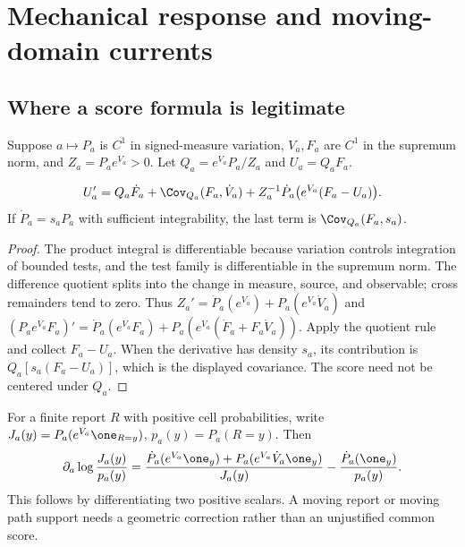 \section{Mechanical response and moving-domain currents}\label{sec:response}
\subsection{Where a score formula is legitimate}
Suppose $a\mapsto P_a$ is $C^1$ in signed-measure variation, $V_a,F_a$ are $C^1$ in the supremum norm, and $Z_a=P_ae^{V_a}>0$. Let $Q_a=e^{V_a}P_a/Z_a$ and $U_a=Q_aF_a$.

\begin{theorem}\label{thm:regular-response}
\begin{equation}
 U_a'=Q_a\dot F_a+\Cov_{Q_a}(F_a,\dot V_a)
 +Z_a^{-1}\dot P_a\bigl(e^{V_a}(F_a-U_a)\bigr).
 \label{eq:separated-response}
\end{equation}
If $\dot P_a=s_aP_a$ with sufficient integrability, the last term is $\Cov_{Q_a}(F_a,s_a)$.
\end{theorem}
\begin{proof}
The product integral is differentiable because variation controls integration of bounded tests, and the test family is differentiable in the supremum norm. The difference quotient splits into the change in measure, source, and observable; cross remainders tend to zero. Thus
$Z_a'=\dot P_a(e^{V_a})+P_a(e^{V_a}\dot V_a)$ and
$(P_ae^{V_a}F_a)'=\dot P_a(e^{V_a}F_a)+P_a(e^{V_a}(\dot F_a+F_a\dot V_a))$.
Apply the quotient rule and collect $F_a-U_a$. When the derivative has density $s_a$, its contribution is $Q_a[s_a(F_a-U_a)]$, which is the displayed covariance. The score need not be centered under $Q_a$.
\end{proof}

For a finite report $R$ with positive cell probabilities, write
$J_a(y)=P_a(e^{V_a}\one_{R=y})$, $p_a(y)=P_a(R=y)$. Then
\begin{equation}
 \partial_a\log\frac{J_a(y)}{p_a(y)}
 =\frac{\dot P_a(e^{V_a}\one_y)+P_a(e^{V_a}\dot V_a\one_y)}{J_a(y)}
 -\frac{\dot P_a(\one_y)}{p_a(y)}.
 \label{eq:projected-response}
\end{equation}
This follows by differentiating two positive scalars. A moving report or moving path support needs a geometric correction rather than an unjustified common score.

